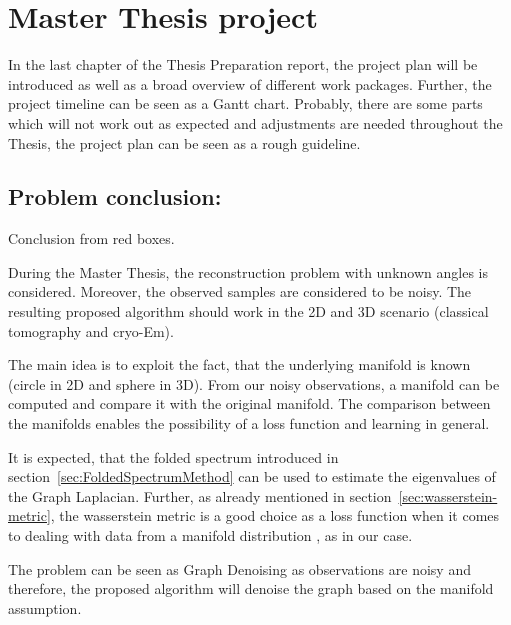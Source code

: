 \chapter{Master Thesis project}
\label{sec:projectPlan}
In the last chapter of the Thesis Preparation report, the project plan will be introduced as well as a broad overview of different 
work packages. Further, the project timeline can be seen as a Gantt chart.
Probably, there are some parts which will not work out as expected and 
adjustments are needed throughout the Thesis, the project plan can be seen as a rough guideline.

\section{Problem conclusion:}
Conclusion from red boxes.

During the Master Thesis, the reconstruction problem with unknown angles is considered. 
Moreover, the observed samples are considered to be noisy. 
The resulting proposed algorithm should work in the 2D and 3D scenario (classical tomography and cryo-Em).

The main idea is to exploit the fact, that the underlying manifold is known (circle in 2D and sphere in 3D). 
From our noisy observations, a manifold can be computed and compare it with the original manifold.
The comparison between the manifolds enables the possibility of a loss function and learning in general.

It is expected, that the folded spectrum \cite{foldedSpectrumMethod} introduced in section~\ref{sec:FoldedSpectrumMethod}
can be used to estimate the eigenvalues of the Graph Laplacian.
Further, as already mentioned in section~\ref{sec:wasserstein-metric}, the wasserstein metric is a good choice
as a loss function when it comes to dealing with data from a manifold distribution \cite{wassersteinGAN}, as in our case. 

The problem can be seen as Graph Denoising as observations are noisy and therefore, the proposed algorithm 
will denoise the graph based on the manifold assumption. 



